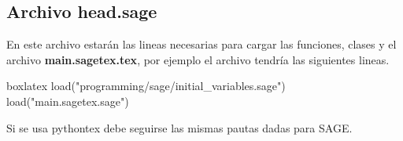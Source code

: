 {	    \subsection{Archivo head.sage}
	    En este archivo estarán las lineas necesarias para cargar las funciones, clases y el archivo \textbf{main.sagetex.tex}, por ejemplo el archivo tendría las siguientes lineas.
	    \begin{tcblisting}{boxlatex}
	    	load("programming/sage/initial_variables.sage")
	    	load("main.sagetex.sage")
	    \end{tcblisting}
	    \begin{boxbasic}[Nota]
	    	Si se usa pythontex debe seguirse las mismas pautas dadas para SAGE.
	    \end{boxbasic}
}